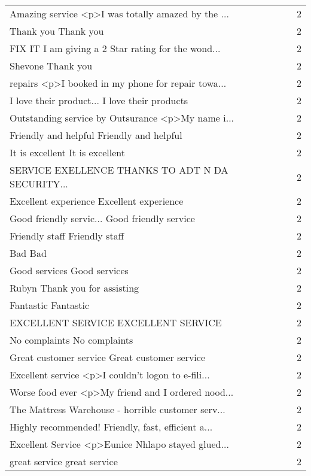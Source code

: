 \begin{tabular}{lr}
Amazing service <p>I was totally amazed by the ... &        2 \\
Thank you Thank you                                &        2 \\
FIX IT I am giving a 2 Star rating for the wond... &        2 \\
Shevone Thank you                                  &        2 \\
repairs <p>I booked in my phone for repair towa... &        2 \\
I love their product... I love their products      &        2 \\
Outstanding service by Outsurance  <p>My name i... &        2 \\
Friendly and helpful Friendly and helpful          &        2 \\
It is excellent It is excellent                    &        2 \\
SERVICE EXELLENCE  THANKS  TO ADT N DA SECURITY... &        2 \\
Excellent experience Excellent experience          &        2 \\
Good friendly servic... Good friendly service      &        2 \\
Friendly staff Friendly staff                      &        2 \\
Bad Bad                                            &        2 \\
Good services Good services                        &        2 \\
Rubyn Thank you for assisting                      &        2 \\
Fantastic Fantastic                                &        2 \\
EXCELLENT SERVICE EXCELLENT SERVICE                &        2 \\
No complaints No complaints                        &        2 \\
Great customer service  Great customer service     &        2 \\
Excellent service <p>I couldn't logon to e-fili... &        2 \\
Worse food ever <p>My friend and I ordered nood... &        2 \\
The Mattress Warehouse - horrible customer serv... &        2 \\
Highly recommended! Friendly, fast, efficient a... &        2 \\
Excellent Service <p>Eunice Nhlapo stayed glued... &        2 \\
great service great service                        &        2 \\
\bottomrule
\end{tabular}
